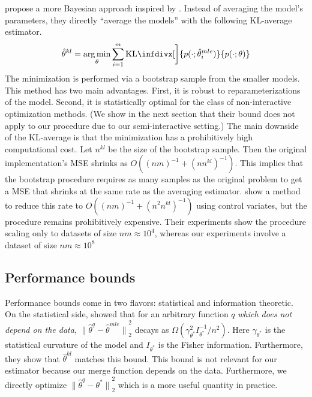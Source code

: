 \documentclass[twoside]{article}
\DeclareMathOperator*{\argmin}{arg\,min}
\newcommand{\w}{\theta}
\newcommand{\wkl}{\hat\w^{kl}}
\newcommand{\wmle}{\hat\w^{mle}}
\newcommand{\wstar}{{\w^{*}}}
\newcommand{\wq}{\hat\w^{q}}
\newcommand{\ltwo}[1]{{\lVert {#1} \rVert}_2}
\newcommand{\kl}{\text{KL}\infdivx}
\begin{document}
\cite{liu2014distributed} propose a more Bayesian approach inspired by \cite{merugu2003privacy}.
Instead of averaging the model's parameters,
they directly ``average the models'' with the following KL-average estimator.
\begin{equation}
\wkl = \argmin_\w \sum_{i=1}^m \kl[\bigg]{p(\cdot;\wmle_i)}{p(\cdot;\w)}
\end{equation}
The minimization is performed via a bootstrap sample from the smaller models.
This method has two main advantages.
First, it is robust to reparameterizations of the model.
Second, it is statistically optimal for the class of non-interactive optimization methods.
(We show in the next section that their bound does not apply to our procedure due to our semi-interactive setting.)
The main downside of the KL-average is that the minimization has a prohibitively high computational cost.
Let $n^{kl}$ be the size of the bootstrap sample.
Then the original implementation's MSE shrinks as $O((nm)^{-1}+(nn^{kl})^{-1})$.
This implies that the bootstrap procedure requires as many samples as the original problem to get a MSE that shrinks at the same rate as the averaging estimator.
\cite{han2016bootstrap} show a method to reduce this rate to $O((nm)^{-1}+(n^2n^{kl})^{-1})$ using control variates, but the procedure remains prohibitively expensive.
Their experiments show the procedure scaling only to datasets of size $nm\approx10^4$,
whereas our experiments involve a dataset of size $nm\approx10^8$

\subsection{Performance bounds}

Performance bounds come in two flavors: statistical and information theoretic.
On the statistical side, \cite{liu2014distributed} showed that for an arbitrary function $q$ \emph{which does not depend on the data},
$\ltwo{\wq-\wmle}^2$ decays as $\Omega(\gamma^2_\wstar I^{-1}_\wstar/n^2)$.
Here $\gamma_\wstar$ is the statistical curvature of the model and $I_\wstar$ is the Fisher information.
Furthermore, they show that $\wkl$ matches this bound.
This bound is not relevant for our estimator because our merge function depends on the data.
Furthermore, we directly optimize $\ltwo{\wq-\wstar}^2$ which is a more useful quantity in practice.
\end{document}

